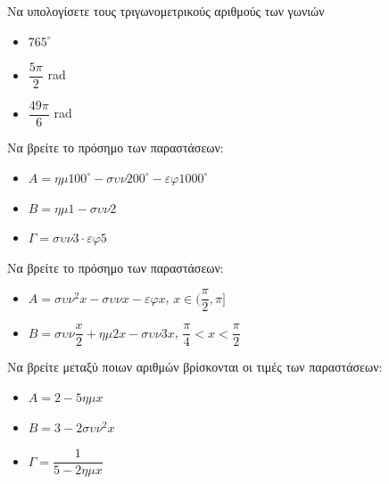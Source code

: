 \documentclass{presentation}
\begin{document}
\begin{askisi}
  Να υπολογίσετε τους τριγωνομετρικούς αριθμούς των γωνιών
  \begin{itemize}
    \item<1-> $765^{\circ}$
    \item<2-> $\dfrac{5π}{2}$ rad
    \item<3-> $\dfrac{49π}{6}$ rad
  \end{itemize}
\end{askisi}

\begin{askisi}
  Να βρείτε το πρόσημο των παραστάσεων:
  \begin{itemize}
    \item<1-> $Α=ημ100^{\circ}-συν200^{\circ}-εφ1000^{\circ}$
    \item<2-> $Β=ημ1-συν2$
    \item<3-> $Γ=συν3 \cdot εφ5$
  \end{itemize}
\end{askisi}

\begin{askisi}
  Να βρείτε το πρόσημο των παραστάσεων:
  \begin{itemize}
    \item<1-> $Α=συν^2x-συνx-εφx$, $x\in (\dfrac{π}{2},π]$
    \item<2-> $Β=συν\dfrac{x}{2}+ημ2x-συν3x$, $\dfrac{π}{4}<x<\dfrac{π}{2}$
  \end{itemize}
\end{askisi}

\begin{askisi}
  Να βρείτε μεταξύ ποιων αριθμών βρίσκονται οι τιμές των παραστάσεων:
  \begin{itemize}
    \item<1-> $Α=2-5ημx$
    \item<2-> $Β=3-2συν^2x$
    \item<3-> $Γ=\dfrac{1}{5-2ημx}$
  \end{itemize}
\end{askisi}

\moodle

\end{document}
